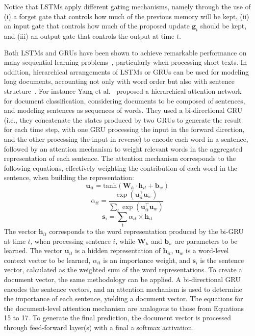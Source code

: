 Notice that LSTMs apply different gating mechanisms, namely through the use of (i) a forget gate that controls how much of the previous memory will be kept, (ii) an input gate that controls how much of the proposed update $\mathbf{\mathbf{g}}_{t}$ should be kept, and (iii) an output gate that controls the output at time $t$.

Both LSTMs and GRUs have been shown to achieve remarkable performance on many sequential learning problems~\cite{yin2017comparative}, particularly when processing short texts. In addition, hierarchical arrangements of LSTMs or GRUs can be used for modeling long documents, accounting not only with word order but also with sentence structure~\cite{hierarchical,franciscoduarte}. For instance Yang et al.~\cite{hierarchical} proposed a hierarchical attention network for document classification, considering documents to be composed of sentences, and modeling sentences as sequences of words. They used a bi-directional GRU (i.e., they concatenate the states produced by two GRUs to generate the result for each time step, with one GRU processing the input in the forward direction, and the other processing the input in reverse) to encode each word in a sentence, followed by an attention mechanism to weight relevant words in the aggregated representation of each sentence. The attention mechanism corresponds to the following equations, effectively weighting the contribution of each word in the sentence, when building the representation:
\begin{equation}
\boldsymbol{u}_{it} = \mathrm{tanh}(\boldsymbol{W}_h \cdot \boldsymbol{h}_{it} + \boldsymbol{b}_w)
\end{equation}
\begin{equation}
\alpha_{it} = \frac{\exp(\boldsymbol{u}_{it}^\top\boldsymbol{u}_w)}{\sum\nolimits_t\exp(\boldsymbol{u}_{it}^\top\boldsymbol{u}_w)}
\end{equation}
\begin{equation}
\boldsymbol{s}_i = \sum_t \alpha_{it} \times \boldsymbol{h}_{it}
\label{eq:hierarchicalattention}
\end{equation}
The vector $\boldsymbol{h}_{it}$ corresponds to the word representation produced by the bi-GRU at time $t$, when processing sentence $i$, while $\boldsymbol{W}_h$ and $\boldsymbol{b}_w$ are parameters to be learned. The vector $\boldsymbol{u}_{it}$ is a hidden representation of $\boldsymbol{h}_{it}$,  $\boldsymbol{u}_w$ is a word-level context vector to be learned, $\alpha_{it}$ is an importance weight, and $\boldsymbol{s}_i$ is the sentence vector, calculated as the weighted sum of the word representations. To create a document vector, the same methodology can be applied. A bi-directional GRU encodes the sentence vectors, and an attention mechanism is used to determine the importance of each sentence, yielding a document vector. The equations for the document-level attention mechanism are analogous to those from Equations 15 to 17. To generate the final prediction, the document vector is processed through feed-forward layer(s) with a final a softmax activation.

